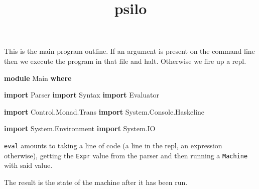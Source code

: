 \documentclass[]{article}
\title{psilo}
\date{}
\newenvironment{Shaded}{}{}
\newcommand{\KeywordTok}[1]{\textcolor[rgb]{0.00,0.44,0.13}{\textbf{{#1}}}}
\newcommand{\DataTypeTok}[1]{\textcolor[rgb]{0.56,0.13,0.00}{{#1}}}
\newcommand{\OtherTok}[1]{\textcolor[rgb]{0.00,0.44,0.13}{{#1}}}
\newcommand{\FunctionTok}[1]{\textcolor[rgb]{0.02,0.16,0.49}{{#1}}}
\newcommand{\NormalTok}[1]{{#1}}
\begin{document}
\maketitle

This is the main program outline. If an argument is present on the
command line then we execute the program in that file and halt.
Otherwise we fire up a repl.

\begin{Shaded}
\begin{Highlighting}[]
\KeywordTok{module} \DataTypeTok{Main} \KeywordTok{where}

\KeywordTok{import }\DataTypeTok{Parser}
\KeywordTok{import }\DataTypeTok{Syntax}
\KeywordTok{import }\DataTypeTok{Evaluator}

\KeywordTok{import }\DataTypeTok{Control.Monad.Trans}
\KeywordTok{import }\DataTypeTok{System.Console.Haskeline}

\KeywordTok{import }\DataTypeTok{System.Environment}
\KeywordTok{import }\DataTypeTok{System.IO}
\end{Highlighting}
\end{Shaded}

\texttt{eval} amounts to taking a line of code (a line in the repl, an
expression otherwise), getting the \texttt{Expr} value from the parser
and then running a \texttt{Machine} with said value.

The result is the state of the machine after it has been run.

\begin{Shaded}
\end{Shaded}
\end{document}
